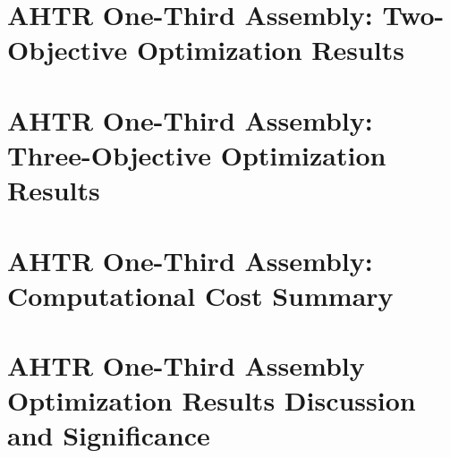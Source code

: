 \section{AHTR One-Third Assembly: Two-Objective Optimization Results}

\section{AHTR One-Third Assembly: Three-Objective Optimization Results}

\section{AHTR One-Third Assembly: Computational Cost Summary}
\label{sec:assem-compute-cost}

\section{AHTR One-Third Assembly Optimization Results Discussion and Significance}